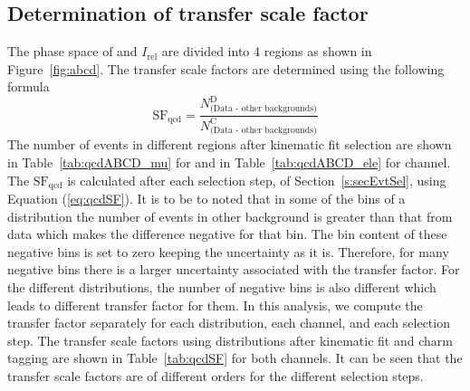 \subsection{Determination of transfer scale factor}
The phase space of \MET and $I_{\text{rel}}$ are divided into 4 
regions as shown in Figure~\ref{fig:abcd}. The transfer scale factors 
are determined using the following formula 
\begin{equation}
    {\text{SF}_{\text{qcd}}} = \frac{N_{\text{(Data - other backgrounds)}}^\text{D}}{N_{\text {(Data - other backgrounds)}}^\text{C}}
\label{eq:qcdSF}
\end{equation}
The number of events in different regions after kinematic fit 
selection are shown in Table~\ref{tab:qcdABCD_mu} for \mujets and in 
Table~\ref{tab:qcdABCD_ele} for \ejets channel. The 
$\text{SF}_{\text{qcd}}$ is calculated after each selection step, of 
Section~\ref{s:secEvtSel}, using Equation (\ref{eq:qcdSF}). It is to 
be to noted that in some of the bins of a distribution the number of
events in other background is greater than that from data which makes
the difference negative for that bin. The bin content of these negative
bins is set to zero keeping the uncertainty as it is. Therefore, for 
many negative bins there is a larger uncertainty associated with the
transfer factor. For the different distributions, the number of negative
bins is also different which leads to different transfer factor for
them. In this analysis, we compute the transfer factor separately for
each distribution, each channel, and each selection step. The transfer 
scale factors using \mjj distributions after kinematic fit
and charm tagging are shown in Table~\ref{tab:qcdSF} for both 
channels. It can be seen that the transfer scale factors are of 
different orders for the different selection steps.

